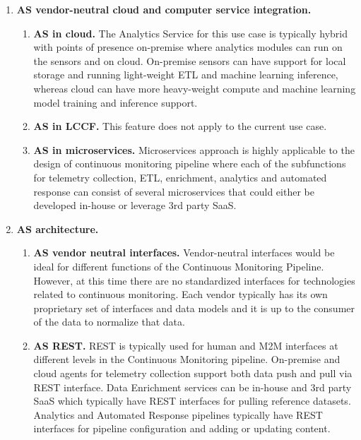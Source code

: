 \begin{enumerate}

\item{\bf AS vendor-neutral cloud and computer service integration.}

  \begin{enumerate}
  
  \item {\bf AS in cloud.} The Analytics Service for this use case is typically hybrid with points of presence on-premise where analytics modules can run on the sensors and on cloud. On-premise sensors can have support for local storage and running light-weight ETL and machine learning inference, whereas cloud can have more heavy-weight compute and machine learning model training and inference support.
  
  \item {\bf AS in LCCF.} This feature does not apply to the current use case.
  
  \item {\bf AS in microservices.} Microservices approach is highly applicable to the design of continuous monitoring pipeline where each of the subfunctions for telemetry collection, ETL, enrichment, analytics and automated response can consist of several microservices that could either be developed in-house or leverage 3rd party SaaS.
  
  \end{enumerate}

\item{\bf AS architecture.}

  \begin{enumerate}
  
  \item{\bf AS vendor neutral interfaces.} Vendor-neutral interfaces would be ideal for different functions of the Continuous Monitoring Pipeline. However, at this time there are no standardized interfaces for technologies related to continuous monitoring. Each vendor typically has its own proprietary set of interfaces and data models and it is up to the consumer of the data to normalize that data.
  
  \item{\bf AS REST.} REST is typically used for human and M2M interfaces at different levels in the Continuous Monitoring pipeline. On-premise and cloud agents for telemetry collection support both data push and pull via REST interface. Data Enrichment services can be in-house and 3rd party SaaS which typically have REST interfaces for pulling reference datasets. Analytics and Automated Response pipelines typically have REST interfaces for pipeline configuration and adding or updating content.
  

\end{enumerate}
\end{enumerate}
